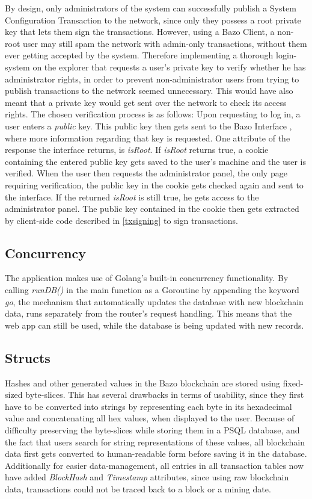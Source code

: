 By design, only administrators of the system can successfully publish a System Configuration Transaction to the network, since only they possess a root private key that lets them sign the transactions. However, using a Bazo Client, a non-root user may still spam the network with admin-only transactions, without them ever getting accepted by the system. Therefore implementing a thorough login-system on the explorer that requests a user's private key to verify whether he has administrator rights, in order to prevent non-administrator users from trying to publish transactions to the network seemed unnecessary. This would have also meant that a private key would get sent over the network to check its access rights. The chosen verification process is as follows:
Upon requesting to log in, a user enters a \emph{public} key. This public key then gets sent to the Bazo Interface \cite{marc}, where more information regarding that key is requested. One attribute of the response the interface returns, is \emph{isRoot}. If \emph{isRoot} returns true, a cookie containing the entered public key gets saved to the user's machine and the user is verified. When the user then requests the administrator panel, the only page requiring verification, the public key in the cookie gets checked again and sent to the interface. If the returned \emph{isRoot} is still true, he gets access to the administrator panel. The public key contained in the cookie then gets extracted by client-side code described in \ref{txsigning} to sign transactions.

\subsection{Concurrency}
The application makes use of Golang's built-in concurrency functionality. By calling \emph{runDB()} in the main function as a Goroutine by appending the keyword \emph{go}, the mechanism that automatically updates the database with new blockchain data, runs separately from the router's request handling. This means that the web app can still be used, while the database is being updated with new records.

\subsection{Structs}
Hashes and other generated values in the Bazo blockchain are stored using fixed-sized byte-slices. This has several drawbacks in terms of usability, since they first have to be converted into strings by representing each byte in its hexadecimal value and concatenating all hex values, when displayed to the user. Because of difficulty preserving the byte-slices while storing them in a PSQL database, and the fact that users search for string representations of these values, all blockchain data first gets converted to human-readable form before saving it in the database. Additionally for easier data-management, all entries in all transaction tables now have added \emph{BlockHash} and \emph{Timestamp} attributes, since using raw blockchain data, transactions could not be traced back to a block or a mining date.

